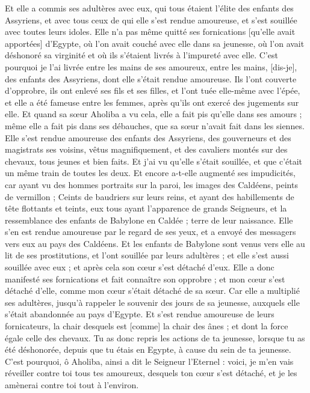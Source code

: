 \begin{multicols}{2}
Et elle a commis ses adultères avec eux, qui tous étaient l'élite des enfants des Assyriens, et avec tous ceux de qui elle s'est rendue amoureuse, et s'est souillée avec toutes leurs idoles.
Elle n'a pas même quitté ses fornications [qu'elle avait apportées] d'Egypte, où l'on avait couché avec elle dans sa jeunesse, où l'on avait déshonoré sa virginité et où ils s'étaient livrés à l'impureté avec elle.
C'est pourquoi je l'ai livrée entre les mains de ses amoureux, entre les mains, [dis-je], des enfants des Assyriens, dont elle s'était rendue amoureuse.
Ils l'ont couverte d'opprobre, ils ont enlevé ses fils et ses filles, et l'ont tuée elle-même avec l'épée, et elle a été fameuse entre les femmes, après qu'ils ont exercé des jugements sur elle.
Et quand sa sœur Aholiba a vu cela, elle a fait pis qu'elle dans ses amours ; même elle a fait pis dans ses débauches, que sa sœur n'avait fait dans les siennes.
Elle s'est rendue amoureuse des enfants des Assyriens, des gouverneurs et des magistrats ses voisins, vêtus magnifiquement, et des cavaliers montés sur des chevaux, tous jeunes et bien faits.
Et j'ai vu qu'elle s'était souillée, et que c'était un même train de toutes les deux.
Et encore a-t-elle augmenté ses impudicités, car ayant vu des hommes portraits sur la paroi, les images des Caldéens, peints de vermillon ;
Ceints de baudriers sur leurs reins, et ayant des habillements de tête flottants et teints, eux tous ayant l'apparence de grands Seigneurs, et la ressemblance des enfants de Babylone en Caldée ; terre de leur naissance.
Elle s'en est rendue amoureuse par le regard de ses yeux, et a envoyé des messagers vers eux au pays des Caldéens.
Et les enfants de Babylone sont venus vers elle au lit de ses prostitutions, et l'ont souillée par leurs adultères ; et elle s'est aussi souillée avec eux ; et après cela son cœur s'est détaché d'eux.
Elle a donc manifesté ses fornications et fait connaître son opprobre ; et mon cœur s'est détaché d'elle, comme mon cœur s'était détaché de sa sœur.
Car elle a multiplié ses adultères, jusqu'à rappeler le souvenir des jours de sa jeunesse, auxquels elle s'était abandonnée au pays d'Egypte.
Et s'est rendue amoureuse de leurs fornicateurs, la chair desquels est [comme] la chair des ânes ; et dont la force égale celle des chevaux.
Tu as donc repris les actions de ta jeunesse, lorsque tu as été déshonorée, depuis que tu étais en Egypte, à cause du sein de ta jeunesse.
C'est pourquoi, ô Aholiba, ainsi a dit le Seigneur l'Eternel : voici, je m'en vais réveiller contre toi tous tes amoureux, desquels ton cœur s'est détaché, et je les amènerai contre toi tout à l'environ.

\end{multicols}

